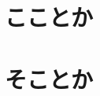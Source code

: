 \documentclass[a4paper,dvipdfmx]{article}
\begin{document}
\section{こことか}
\section{そことか}
\end{document}
